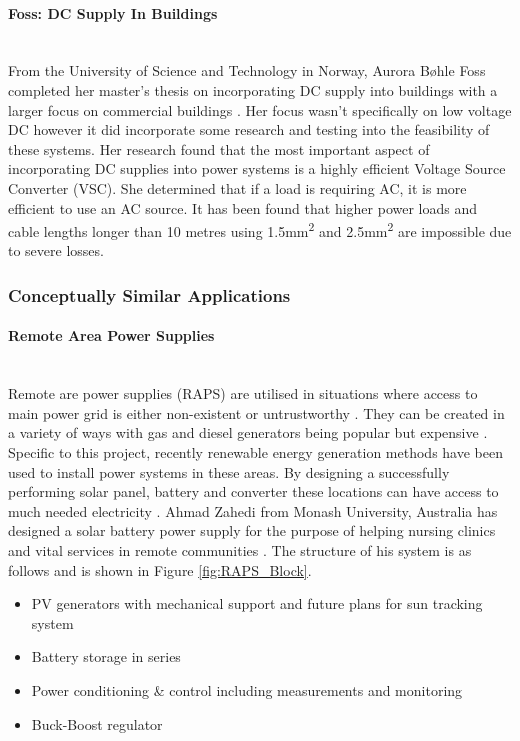 \paragraph{Foss: DC Supply In Buildings}
~\\
From the University of Science and Technology in Norway, Aurora Bøhle Foss completed her master's thesis on incorporating DC supply into buildings with a larger focus on commercial buildings \cite{Foss2014}. Her focus wasn't specifically on low voltage DC however it did incorporate some research and testing into the feasibility of these systems. Her research found that the most important aspect of incorporating DC supplies into power systems is a highly efficient Voltage Source Converter (VSC). She determined that if a load is requiring AC, it is more efficient to use an AC source. It has been found that higher power loads and cable lengths longer than 10 metres using  1.5\si{mm^2} and  2.5\si{mm^2} are impossible due to severe losses.

\subsubsection{Conceptually Similar Applications}

\paragraph{Remote Area Power Supplies}
~\\
Remote are power supplies (RAPS) are utilised in situations where access to main power grid is either non-existent or untrustworthy \cite{Mendis2010}. They can be created in a variety of ways with gas and diesel generators being popular but expensive \cite{Mendis2010}. Specific to this project, recently renewable energy generation methods have been used to install power systems in these areas. By designing a successfully performing solar panel, battery and converter these locations can have access to much needed electricity \cite{Zahedi}. Ahmad Zahedi from Monash University, Australia has designed a solar battery power supply for the purpose of helping nursing clinics and vital services in remote communities \cite{Zahedi}. The structure of his system is as follows and is shown in Figure \ref{fig:RAPS_Block}.

\begin{itemize}[noitemsep]
\item PV generators with mechanical support and future plans for sun tracking system
\item Battery storage in series
\item Power conditioning \& control including measurements and monitoring
\item Buck-Boost regulator
\end{itemize}  

